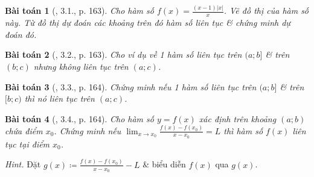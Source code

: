 \documentclass{article}
\newtheorem{baitoan}{Bài toán}
\begin{document}
\begin{baitoan}[\cite{SBT_Toan_11_dai_so_giai_tich_co_ban}, 3.1., p. 163]
	Cho hàm số $f(x) = \frac{(x - 1)|x|}{x}$. Vẽ đồ thị của hàm số này. Từ đồ thị dự đoán các khoảng trên đó hàm số liên tục \& chứng minh dự đoán đó.
\end{baitoan}

\begin{baitoan}[\cite{SBT_Toan_11_dai_so_giai_tich_co_ban}, 3.2., p. 163]
	Cho ví dụ về 1 hàm số liên tục trên $(a;b]$ \& trên $(b;c)$ nhưng không liên tục trên $(a;c)$.
\end{baitoan}

\begin{baitoan}[\cite{SBT_Toan_11_dai_so_giai_tich_co_ban}, 3.3., p. 164]
	Chứng minh nếu 1 hàm số liên tục trên $(a;b]$ \& trên $[b;c)$ thì nó liên tục trên $(a;c)$.
\end{baitoan}

\begin{baitoan}[\cite{SBT_Toan_11_dai_so_giai_tich_co_ban}, 3.4., p. 164]
	Cho hàm số $y = f(x)$ xác định trên khoảng $(a;b)$ chứa điểm $x_0$. Chứng minh nếu $\lim_{x\to x_0} \frac{f(x) - f(x_0)}{x - x_0} = L$ thì hàm số $f(x)$ liên tục tại điểm $x_0$.
\end{baitoan}
\noindent\textit{Hint.} Đặt $g(x)\coloneqq\frac{f(x) - f(x_0)}{x - x_0} - L$ \& biểu diễn $f(x)$ qua $g(x)$.


\printbibliography[heading=bibintoc]
	
\end{document}
